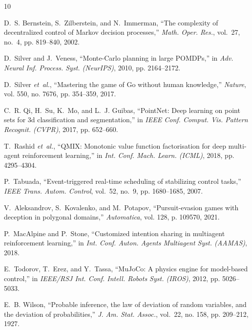 \documentclass[conference]{IEEEtran}
\begin{document}
\begin{thebibliography}{10}

D.~S. Bernstein, S.~Zilberstein, and N.~Immerman, ``The complexity of decentralized control of {Markov} decision processes,'' \emph{Math. Oper. Res.}, vol.~27, no.~4, pp. 819--840, 2002.

D.~Silver and J.~Veness, ``{Monte-Carlo} planning in large {POMDPs},'' in \emph{Adv. Neural Inf. Process. Syst. (NeurIPS)}, 2010, pp. 2164--2172.

D.~Silver \emph{et~al.}, ``Mastering the game of {Go} without human knowledge,'' \emph{Nature}, vol. 550, no. 7676, pp. 354--359, 2017.

C.~R. Qi, H.~Su, K.~Mo, and L.~J. Guibas, ``{PointNet}: Deep learning on point sets for 3d classification and segmentation,'' in \emph{IEEE Conf. Comput. Vis. Pattern Recognit. (CVPR)}, 2017, pp. 652--660.

T.~Rashid \emph{et~al.}, ``{QMIX}: Monotonic value function factorisation for deep multi-agent reinforcement learning,'' in \emph{Int. Conf. Mach. Learn. (ICML)}, 2018, pp. 4295--4304.

P.~Tabuada, ``Event-triggered real-time scheduling of stabilizing control tasks,'' \emph{IEEE Trans. Autom. Control}, vol.~52, no.~9, pp. 1680--1685, 2007.

V.~Aleksandrov, S.~Kovalenko, and M.~Potapov, ``Pursuit-evasion games with deception in polygonal domains,'' \emph{Automatica}, vol. 128, p. 109570, 2021.

P.~MacAlpine and P.~Stone, ``Customized intention sharing in multiagent reinforcement learning,'' in \emph{Int. Conf. Auton. Agents Multiagent Syst. (AAMAS)}, 2018.

E.~Todorov, T.~Erez, and Y.~Tassa, ``{MuJoCo}: A physics engine for model-based control,'' in \emph{IEEE/RSJ Int. Conf. Intell. Robots Syst. (IROS)}, 2012, pp. 5026--5033.

E.~B. Wilson, ``Probable inference, the law of deviation of random variables, and the deviation of probabilities,'' \emph{J. Am. Stat. Assoc.}, vol.~22, no. 158, pp. 209--212, 1927.

\end{thebibliography}
\end{document}
